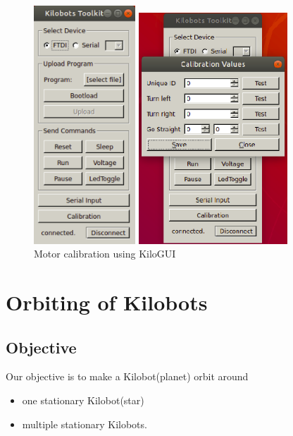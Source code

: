 \documentclass{report}[12pt]
\begin{document}
\begin{figure}[H]
\centering
	\begin{minipage}{.4\textwidth}
	\centering
	\includegraphics[width=1.5in]{images/kilogui.png}
	\end{minipage}
	\begin{minipage}{.4\textwidth}
	\centering
	\includegraphics[width=2.2in]{images/kilogui-motor-calib.png}
	\end{minipage}
\caption{Motor calibration using KiloGUI}
\label{fig:Motor calibration using KiloGUI}
\end{figure}

\chapter{Orbiting of Kilobots}

\section{Objective}
Our objective is to make a Kilobot(planet) orbit around 
\begin{itemize}
    \item one stationary Kilobot(star)
    \item multiple stationary Kilobots.
\end{itemize} 
\end{document}
